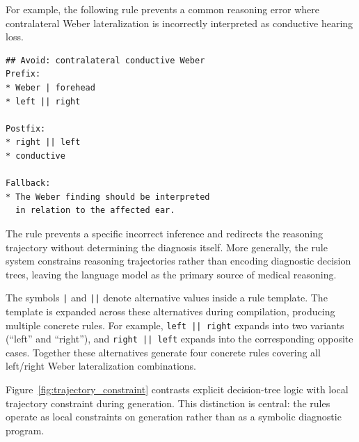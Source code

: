\documentclass[twocolumn]{article}
\begin{document}
For example, the following rule prevents a common reasoning error where
contralateral Weber lateralization is incorrectly interpreted as conductive
hearing loss.

\begin{verbatim}
## Avoid: contralateral conductive Weber
Prefix:
* Weber | forehead
* left || right

Postfix:
* right || left
* conductive

Fallback:
* The Weber finding should be interpreted
  in relation to the affected ear.
\end{verbatim}

The rule prevents a specific incorrect inference and redirects the reasoning
trajectory without determining the diagnosis itself. More generally, the rule
system constrains reasoning trajectories rather than encoding diagnostic
decision trees, leaving the language model as the primary source of medical
reasoning.

The symbols \texttt{|} and \texttt{||} denote alternative values inside a rule
template. The template is expanded across these alternatives during compilation,
producing multiple concrete rules. For example, \texttt{left || right} expands
into two variants (``left'' and ``right''), and \texttt{right || left} expands
into the corresponding opposite cases. Together these alternatives generate four
concrete rules covering all left/right Weber lateralization combinations.

Figure~\ref{fig:trajectory_constraint} contrasts explicit decision-tree logic
with local trajectory constraint during generation. This distinction is central:
the rules operate as local constraints on generation rather than as a symbolic
diagnostic program.
\end{document}
